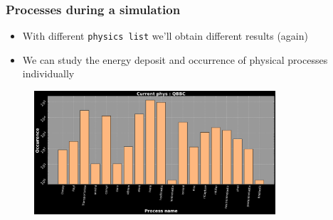 \begin{frame}
\frametitle{Processes during a simulation}

\begin{block}{}
	\begin{itemize}
		\item With different \texttt{physics list} we'll obtain different results (again)
		\item We can study the energy deposit and occurrence of physical processes individually
	\end{itemize}
\end{block}

\begin{figure}
	\includegraphics[width=0.8\textwidth]{images/process_dist_E100_phQBBC.png}
\end{figure}

\end{frame}